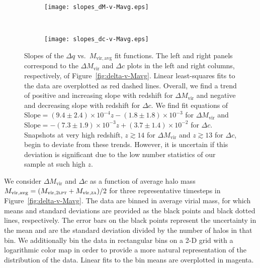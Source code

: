 \begin{figure*}[t]
	\centering
	\begin{subfigure}{}
		\texttt{[image: slopes\_dM-v-Mavg.eps]}
	\end{subfigure}
	~
	\begin{subfigure}{}
		\texttt{[image: slopes\_dc-v-Mavg.eps]}
	\end{subfigure}
	\caption[Slopes of the $\Delta q$ vs.\ $M_{\mathrm{vir,avg}}$ fit functions.]{\footnotesize Slopes of the $\Delta q$ vs.\ $M_{\mathrm{vir,avg}}$ fit functions.  The left and right panels correspond to the $\Delta M_{\mathrm{vir}}$ and $\Delta c$ plots in the left and right columns, respectively, of Figure~\ref{fig:delta-v-Mavg}.  Linear least-squares fits to the data are overplotted as red dashed lines.  Overall, we find a trend of positive and increasing slope with redshift for $\Delta M_{\mathrm{vir}}$ and negative and decreasing slope with redshift for $\Delta c$.  We find fit equations of $\mathrm{Slope} = (9.4 \pm 2.4) \times 10^{-4} z - (1.8 \pm 1.8) \times 10^{-3}$ for $\Delta M_{\mathrm{vir}}$ and $\mathrm{Slope} = -(7.3 \pm 1.9) \times 10^{-3} z + (3.7 \pm 1.4) \times 10^{-2}$ for $\Delta c$.  Snapshots at very high redshift, $z \gtrsim 14$ for $\Delta M_{\mathrm{vir}}$ and $z \gtrsim 13$ for $\Delta c$, begin to deviate from these trends.  However, it is uncertain if this deviation is significant due to the low number statistics of our sample at such high $z$.}
	\label{fig:slopes_delta-v-Mavg}
\end{figure*}

We consider $\Delta M_{\mathrm{vir}}$ and $\Delta c$ as a function of average halo mass $M_{\mathrm{vir,avg}} = (M_{\mathrm{vir},\textsc{2lpt}} + M_{\mathrm{vir},\textsc{za}}) / 2$ for three representative timesteps in Figure~\ref{fig:delta-v-Mavg}.  The data are binned in average virial mass, for which means and standard deviations are provided as the black points and black dotted lines, respectively.  The error bars on the black points represent the uncertainty in the mean and are the standard deviation divided by the number of halos in that bin.  We additionally bin the data in rectangular bins on a 2-D grid with a logarithmic color map in order to provide a more natural representation of the distribution of the data.  Linear fits to the bin means are overplotted in magenta.

